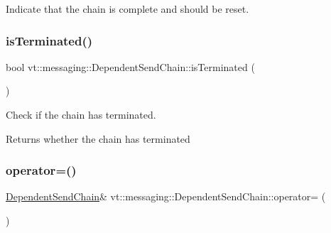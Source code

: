Indicate that the chain is complete and should be reset. 

\mbox{\label{classvt_1_1messaging_1_1_dependent_send_chain_a7a75a0b1850c0463c84a15c0df6520db}} 
\subsubsection{\texorpdfstring{is\+Terminated()}{isTerminated()}}
{\footnotesize\ttfamily bool vt\+::messaging\+::\+Dependent\+Send\+Chain\+::is\+Terminated (\begin{DoxyParamCaption}{ }\end{DoxyParamCaption})\hspace{0.3cm}{\ttfamily [inline]}}



Check if the chain has terminated. 

\begin{DoxyReturn}{Returns}
whether the chain has terminated 
\end{DoxyReturn}
\mbox{\label{classvt_1_1messaging_1_1_dependent_send_chain_ae3ec1e39a710da8d3e9d94318294bab6}} 
\subsubsection{\texorpdfstring{operator=()}{operator=()}\hspace{0.1cm}{\footnotesize\ttfamily [1/2]}}
{\footnotesize\ttfamily \hyperlink{classvt_1_1messaging_1_1_dependent_send_chain}{Dependent\+Send\+Chain}\& vt\+::messaging\+::\+Dependent\+Send\+Chain\+::operator= (\begin{DoxyParamCaption}\item[{const \hyperlink{classvt_1_1messaging_1_1_dependent_send_chain}{Dependent\+Send\+Chain} \&}]{ }\end{DoxyParamCaption})\hspace{0.3cm}{\ttfamily [delete]}}

